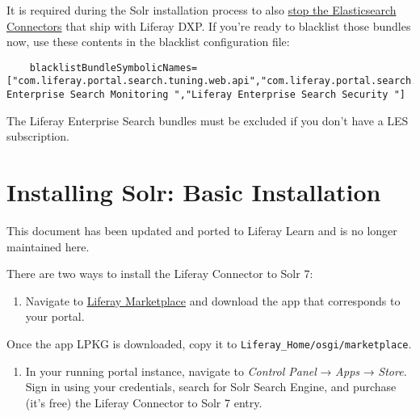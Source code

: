 It is required during the Solr installation process to also
\href{https://portal.liferay.dev/docs/7-2/deploy/-/knowledge_base/d/installing-solr-basic-installation\#stopping-the-elasticsearch-connector}{stop
the Elasticsearch Connectors} that ship with Liferay DXP. If you're
ready to blacklist those bundles now, use these contents in the
blacklist configuration file:

\begin{verbatim}
    blacklistBundleSymbolicNames=["com.liferay.portal.search.tuning.web.api","com.liferay.portal.search.tuning.web","com.liferay.portal.search.tuning.synonyms.web","com.liferay.portal.search.tuning.rankings.web","com.liferay.portal.search.elasticsearch6.spi","com.liferay.portal.search.elasticsearch6.api","com.liferay.portal.search.elasticsearch6.impl","Liferay Enterprise Search Monitoring ","Liferay Enterprise Search Security "]
\end{verbatim}

The Liferay Enterprise Search bundles must be excluded if you don't have
a LES subscription.

\chapter{Installing Solr: Basic
Installation}\label{installing-solr-basic-installation}

{This document has been updated and ported to Liferay Learn and is no
longer maintained here.}

There are two ways to install the Liferay Connector to Solr 7:

\begin{enumerate}
\def\labelenumi{\arabic{enumi}.}
\tightlist
\item
  Navigate to \href{https://web.liferay.com/marketplace/}{Liferay
  Marketplace} and download the app that corresponds to your portal.
\end{enumerate}

Once the app LPKG is downloaded, copy it to
\texttt{Liferay\_Home/osgi/marketplace}.

\begin{enumerate}
\def\labelenumi{\arabic{enumi}.}
\setcounter{enumi}{1}
\tightlist
\item
  In your running portal instance, navigate to \emph{Control Panel} →
  \emph{Apps} → \emph{Store}. Sign in using your credentials, search for
  Solr Search Engine, and purchase (it's free) the Liferay Connector to
  Solr 7 entry.
\end{enumerate}

